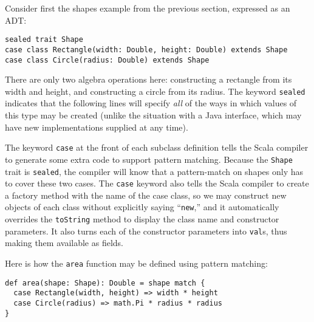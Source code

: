 Consider first the shapes example from the previous section, expressed as an ADT:
\begin{verbatim}
sealed trait Shape
case class Rectangle(width: Double, height: Double) extends Shape
case class Circle(radius: Double) extends Shape
\end{verbatim}
There are only two algebra operations here: constructing a rectangle from its width and height, and constructing a circle from its radius. The keyword \texttt{sealed} indicates that the following lines will specify \emph{all} of the ways in which values of this type may be created (unlike the situation with a Java interface, which may have new implementations supplied at any time).

The keyword \texttt{case} at the front of each subclass definition tells the Scala compiler to generate some extra code to support pattern matching. Because the \texttt{Shape} trait is \texttt{sealed}, the compiler will know that a pattern-match on shapes only has to cover these two cases. The \texttt{case} keyword also tells the Scala compiler to create a factory method with the name of the case class, so we may construct new objects of each class without explicitly saying ``\texttt{new},'' and it automatically overrides the \texttt{toString} method to display the class name and constructor parameters. It also turns each of the constructor parameters into \texttt{val}s, thus making them available as fields.

Here is how the \texttt{area} function may be defined using pattern matching:
\begin{verbatim}
def area(shape: Shape): Double = shape match {
  case Rectangle(width, height) => width * height
  case Circle(radius) => math.Pi * radius * radius
}
\end{verbatim}

